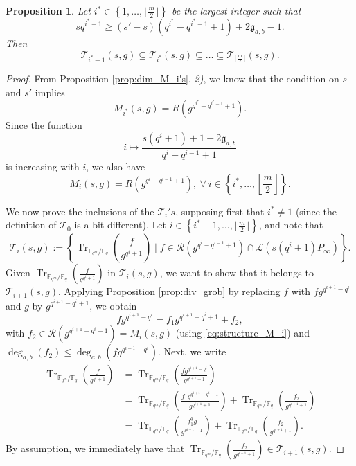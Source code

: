 \documentclass[a4paper]{article}
\newtheorem{proposition}[thm]{Proposition}
\theoremstyle{definition}
\theoremstyle{remark}
\newcommand{\calL}{\mathcal{L}}
\newcommand{\calR}{\mathcal{R}}
\newcommand{\calT}{\mathcal{T}}
\newcommand{\fq}{\mathbb{F}_{q}}
\newcommand{\Tr}[1]{\operatorname{Tr}_{\mathbb{F}_{q^m}/\fq}\left(#1\right)}
\newcommand{\set}[1]{\left\{#1\right\}}
\newcommand{\degab}[1]{\deg_{a,b}\left(#1\right)}
\begin{document}
\begin{proposition} \label{prop:inclusion_T_i's} Let $i^* \in \set{1,\dots,\lfloor\frac{m}{2}\rfloor}$ be the largest integer such that 
$$sq^{i^*-1} \geq (s'-s)(q^{i^*}-q^{i^{*}-1}+1)+2\mathfrak{g}_{a,b}-1.$$ 
Then
$$\calT_{i^*-1}(s,g) \subseteq \calT_{i^*}(s,g) \subseteq \dots \subseteq \calT_{\lfloor \frac{m}{2}\rfloor}(s,g).$$
\end{proposition}

\begin{proof}
From Proposition \ref{prop:dim_M_i's}, \textit{2)}, we know that the condition on $s$ and $s'$ implies $$M_{i^*}(s,g) = R(g^{q^{i^*}-q^{i^*-1}+1}).$$ 
Since the function $$i \mapsto \dfrac{s(q^i+1)+1-2\mathfrak{g}_{a,b}}{q^i-q^{i-1}+1}$$ 
is increasing with $i$, we also have
\begin{equation} \label{eq:structure_M_i}
M_{i}(s,g) = R(g^{q^{i}-q^{i-1}+1}), \ \forall \ i \in \set{i^*,\dots,\left\lfloor \frac{m}{2}\right\rfloor}.
\end{equation} 

We now prove the inclusions of the $\calT_i's$, supposing first that $i^* \neq 1$ (since the definition of $\calT_0$ is a bit different). Let $i \in \set{i^*-1,\dots,\lfloor \frac{m}{2} \rfloor}$, and note that 
$$\calT_i(s,g) := \set{\Tr{\frac{f}{g^{q^i+1}}} \mid f \in \calR(g^{q^i-q^{i-1}+1})\cap \calL(s(q^i+1)P_\infty)}.$$
Given $\Tr{\frac{f}{g^{q^i+1}}}$ in $\calT_i(s,g)$, we want to show that it belongs to $\calT_{i+1}(s,g)$. Applying Proposition \ref{prop:div_grob} by replacing $f$ with $fg^{q^{i+1}-q^i}$ and $g$ by $g^{q^{i+1}-q^i+1}$, we obtain
\begin{equation} \label{eq:division_i}
fg^{q^{i+1}-q^i} = f_1g^{q^{i+1}-q^i+1} + f_2,
\end{equation}
with $f_2 \in \calR(g^{q^{i+1}-q^i+1}) = M_i(s,g)$ (using \eqref{eq:structure_M_i}) and $\degab{f_2} \leq \degab{fg^{q^{i+1}-q^i}}$. Next, we write
\begin{align*}
    \Tr{\frac{f}{g^{q^i+1}}} &= \Tr{\frac{fg^{q^{i+1}-q^i}}{g^{q^{i+1}+1}}} \\
                             &= \Tr{\frac{f_1g^{q^{i+1}-q^i+1}}{g^{q^{i+1}+1}}} + \Tr{\frac{f_2}{g^{q^{i+1}+1}}} \\
                             &= \Tr{\frac{f_1^qg}{g^{q^{i+1}+1}}} + \Tr{\frac{f_2}{g^{q^{i+1}+1}}}.
\end{align*}
By assumption, we immediately have that $\Tr{\frac{f_2}{g^{q^{i+1}+1}}} \in \calT_{i+1}(s,g).$


\end{proof}
\end{document}
